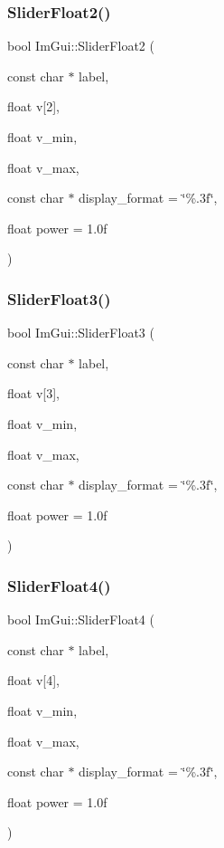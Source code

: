 \subsubsection{\texorpdfstring{Slider\+Float2()}{SliderFloat2()}}
{\footnotesize\ttfamily bool Im\+Gui\+::\+Slider\+Float2 (\begin{DoxyParamCaption}\item[{const char $\ast$}]{label,  }\item[{float}]{v\mbox{[}2\mbox{]},  }\item[{float}]{v\+\_\+min,  }\item[{float}]{v\+\_\+max,  }\item[{const char $\ast$}]{display\+\_\+format = {\ttfamily \char`\"{}\%.3f\char`\"{}},  }\item[{float}]{power = {\ttfamily 1.0f} }\end{DoxyParamCaption})}

\mbox{\label{namespace_im_gui_aab33732d7951627f9c32d708f263889f}} 
\subsubsection{\texorpdfstring{Slider\+Float3()}{SliderFloat3()}}
{\footnotesize\ttfamily bool Im\+Gui\+::\+Slider\+Float3 (\begin{DoxyParamCaption}\item[{const char $\ast$}]{label,  }\item[{float}]{v\mbox{[}3\mbox{]},  }\item[{float}]{v\+\_\+min,  }\item[{float}]{v\+\_\+max,  }\item[{const char $\ast$}]{display\+\_\+format = {\ttfamily \char`\"{}\%.3f\char`\"{}},  }\item[{float}]{power = {\ttfamily 1.0f} }\end{DoxyParamCaption})}

\mbox{\label{namespace_im_gui_aab6b7e99cab3975fece12fb1cd56e281}} 
\subsubsection{\texorpdfstring{Slider\+Float4()}{SliderFloat4()}}
{\footnotesize\ttfamily bool Im\+Gui\+::\+Slider\+Float4 (\begin{DoxyParamCaption}\item[{const char $\ast$}]{label,  }\item[{float}]{v\mbox{[}4\mbox{]},  }\item[{float}]{v\+\_\+min,  }\item[{float}]{v\+\_\+max,  }\item[{const char $\ast$}]{display\+\_\+format = {\ttfamily \char`\"{}\%.3f\char`\"{}},  }\item[{float}]{power = {\ttfamily 1.0f} }\end{DoxyParamCaption})}

